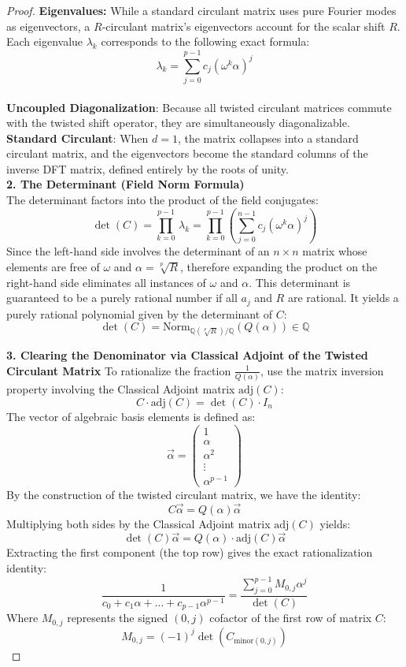 \begin{proof}
{\bf Eigenvalues:} While a standard circulant matrix uses pure Fourier modes as eigenvectors, a $R$-circulant matrix's eigenvectors account for the scalar shift $R$. 
Each eigenvalue \(\lambda _{k}\) corresponds to the following exact formula:  
\[ \lambda_k = \sum_{j=0}^{p-1} c_j \left(\omega^k \alpha \right)^j \] \\

{\bf Uncoupled Diagonalization}: Because all twisted circulant matrices commute with the twisted shift operator, they are simultaneously diagonalizable. \\

{\bf Standard Circulant}: When \(d = 1\), the matrix collapses into a standard circulant matrix, and the eigenvectors become the standard columns of the inverse DFT matrix, 
defined entirely by the roots of unity.\\

{\bf 2. The Determinant (Field Norm Formula)} \\

The determinant factors into the product of the field conjugates:
\[\det (C)= \prod_{k=0}^{p-1}\, \lambda_k  =  \prod _{k=0}^{p-1}\left(\sum _{j=0}^{n-1}c_{j} \left(\omega^{k} \alpha \right)^{j}\right)\]
Since the left-hand side involves the determinant of an $n \times n$ matrix whose elements are free of \(\omega \) and \(\alpha  =  \sqrt[p]{R} \), therefore expanding the product on the right-hand side eliminates all instances of \(\omega \) and \(\alpha  \).
This determinant is guaranteed to be a purely rational number if all \(a_{j}\) and $R$ are rational. 
It yields a purely rational polynomial given by the determinant of $C$:
\[\det (C)=\text{Norm}_{\mathbb{Q}(\sqrt[p]{R})/\mathbb{Q}}(Q(\alpha ))\in \mathbb{Q}\] 

{\bf 3. Clearing the Denominator via Classical Adjoint of the Twisted Circulant Matrix}
To rationalize the fraction \(\frac{1}{Q(\alpha )}\), use the matrix inversion property involving the Classical Adjoint matrix 
\(\text{adj}(C)\): \[C\cdot \text{adj}(C)=\det (C)\cdot I_{n}\]
The vector of algebraic basis elements is defined as:
\[\vec{\alpha }=\left(\begin{matrix}1\\ \alpha \\ \alpha ^{2}\\ \vdots \\ \alpha ^{p-1}\end{matrix}\right)\]
By the construction of the twisted circulant matrix, we have the identity:
\[C\vec{\alpha }=Q(\alpha )\vec{\alpha }\]
Multiplying both sides by the Classical Adjoint matrix 
\(\text{adj}(C)\) yields:\[\det (C)\vec{\alpha }=Q(\alpha )\cdot \text{adj}(C)\vec{\alpha }\]
Extracting the first component (the top row) gives the exact rationalization identity:
\[\frac{1}{c_{0}+c_{1}\alpha +\dots + c_{p-1}\alpha^{p-1}}=\frac{\sum _{j=0}^{p-1}M_{0,j}\alpha ^{j}}{\det (C)}\]
Where \(M_{0,j}\) represents the signed \((0,j)\) cofactor of the first row of matrix \(C\):
\[M_{0,j}=(-1)^{j}\det (C_{\text{minor}(0,j)})\]


\end{proof}
